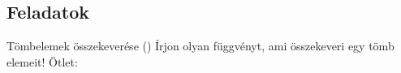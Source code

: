 
\subsection{Feladatok}

\begin{frame}
  \begin{exampleblock}{Tömbelemek összekeverése ()}
    Írjon olyan függvényt, ami összekeveri egy tömb elemeit! Ötlet: 
  \end{exampleblock}
\end{frame}
